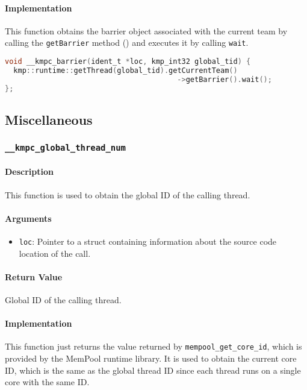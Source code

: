 \paragraph{Implementation} This function obtains the barrier object associated with the current team
by calling the \texttt{getBarrier} method () and executes it by calling \texttt{wait}.

\begin{lstlisting}[language=C, caption={__kmpc_barrier}, label={lst:kmpc-barrier}, escapechar=@]
void __kmpc_barrier(ident_t *loc, kmp_int32 global_tid) {
  kmp::runtime::getThread(global_tid).getCurrentTeam()
                                        ->getBarrier().wait();
};
\end{lstlisting}

\subsection{Miscellaneous}

\subsubsection{\texttt{__kmpc_global_thread_num}}
\label{subsubsec:kmpc-global-thread-num}

\paragraph{Description} This function is used to obtain the global ID of the calling thread.

\paragraph{Arguments}
\begin{itemize}
	\item \texttt{loc}: Pointer to a struct containing information about the source code location
	      of the call.
\end{itemize}

\paragraph{Return Value} Global ID of the calling thread.

\paragraph{Implementation} This function just returns the value returned by
\texttt{mempool_get_core_id}, which is provided by the MemPool runtime library. It is used to obtain
the current core ID, which is the same as the global thread ID since each thread runs on a single
core with the same ID.

